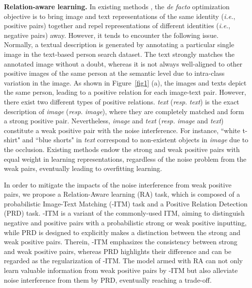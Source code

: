 \documentclass{article}
\begin{document}
\textbf{Relation-aware learning.}
In existing methods \cite{han2021textreid,li2022learning}, the \emph{de facto} optimization objective is to bring image and text representations of the same identity (\emph{i.e.}, positive pairs) together and repel representations of different identities (\emph{i.e.}, negative pairs) away.
However, it tends to encounter the following issue.
Normally, a textual description is generated by annotating a particular single image in the text-based person search dataset. The text strongly matches the annotated image without a doubt, whereas it is not always well-aligned to other positive images of the same person at the semantic level due to intra-class variation in the image.
As shown in Figure~\ref{fig1} (a), the images and texts depict the same person, leading to a positive relation for each image-text pair.
However, there exist two different types of positive relations.
\textit{text} (\emph{resp.} \textit{text}) is the exact description of \textit{image} (\emph{resp.} \textit{image}), where they are completely matched and form a strong positive pair.
Nevertheless, \textit{image} and \textit{text} (\emph{resp.} \textit{image} and \textit{text}) constitute a weak positive pair with the noise interference.
For instance, ``white t-shirt" and ``blue shorts" in \textit{text} correspond to non-existent objects in \textit{image} due to the occlusion.
Existing methods endow the strong and weak positive pairs with equal weight in learning representations, regardless of the noise problem from the weak pairs, eventually leading to overfitting learning.



In order to mitigate the impacts of the noise interference from weak positive pairs, we propose a Relation-Aware learning (RA) task, which is composed of a probabilistic Image-Text Matching (-ITM) task and a Positive Relation Detection (PRD) task.
-ITM is a variant of the commonly-used ITM, aiming to distinguish negative and positive pairs with a probabilistic strong or weak positive inputting, while PRD is designed to explicitly makes a distinction between the strong and weak positive pairs.
Therein, -ITM emphasizes the consistency between strong and weak positive pairs, whereas PRD highlights their difference and can be regarded as the regularization of -ITM. 
The model armed with RA can not only learn valuable information from weak positive pairs by -ITM but also alleviate noise interference from them by PRD, eventually reaching a trade-off.
\end{document}

